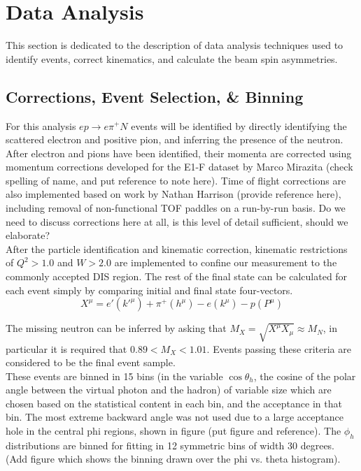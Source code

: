 \section{Data Analysis}

This section is dedicated to the description of data analysis techniques used to identify events, correct kinematics, and calculate the beam spin asymmetries.  
\\

\subsection{Corrections, Event Selection, \& Binning}
For this analysis $ep \rightarrow e\pi^+N$ events will be identified by directly identifying the scattered electron and positive pion, and inferring the presence of the neutron.  
\\
After electron and pions have been identified, their momenta are corrected using momentum corrections developed for the E1-F dataset by Marco Mirazita (check spelling of name, and put reference to note here).  Time of flight corrections are also implemented based on work by Nathan Harrison (provide reference here), including removal of non-functional TOF paddles on a run-by-run basis.  Do we need to discuss corrections here at all, is this level of detail sufficient, should we elaborate?  
\\
After the particle identification and kinematic correction, kinematic restrictions of $Q^{2} > 1.0$ and $W > 2.0$ are implemented to confine our measurement to the commonly accepted DIS region.  The rest of the final state can be calculated for each event simply by comparing initial and final state four-vectors.
\begin{equation}
	X^{\mu} = e'(k'^{\mu}) + \pi^{+}(h^{\mu}) - e(k^\mu) - p(P^\mu) 
\end{equation}  

The missing neutron can be inferred by asking that $M_X = \sqrt{X^{\mu}X_{\mu}} \approx M_{N}$, in particular it is required that $0.89 < M_{X} < 1.01$.  Events passing these criteria are considered to be the final event sample.     
\\
These events are binned in 15 bins (in the variable $\cos{\theta_h}$, the cosine of the polar angle between the virtual photon and the hadron) of variable size which are chosen based on the statistical content in each bin, and the acceptance in that bin.  The most extreme backward angle was not used due to a large acceptance hole in the central phi regions, shown in figure (put figure and reference).  The $\phi_h$ distributions are binned for fitting in 12 symmetric bins of width 30 degrees.  (Add figure which shows the binning drawn over the phi vs. theta histogram).      

